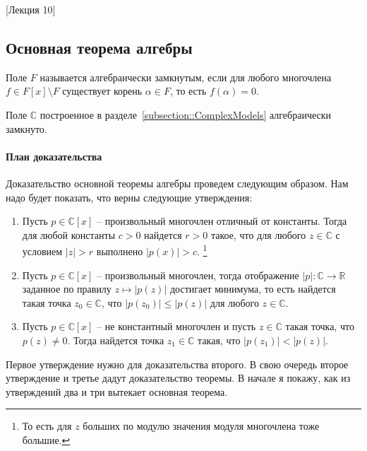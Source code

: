 [Лекция 10]


\subsection{Основная теорема алгебры}

\begin{definition}
Поле $F$ называется алгебраически замкнутым, если для любого многочлена $f\in F[x]\setminus F$ существует корень $\alpha\in F$, то есть $f(\alpha) = 0$.
\end{definition}


\begin{claim}
Поле $\mathbb C$ построенное в разделе~\ref{subsection::ComplexModels} алгебраически замкнуто.
\end{claim}

\paragraph{План доказательства}

Доказательство основной теоремы алгебры проведем следующим образом.
Нам надо будет показать, что верны следующие  утверждения:
\begin{enumerate}
\item Пусть $p\in \mathbb C[x]$ -- произвольный многочлен отличный от константы.
Тогда для любой константы $c > 0$ найдется $r > 0$ такое, что для любого $z\in\mathbb C$ с условием $|z| > r$ выполнено $|p(x)| > c$.%
\footnote{То есть для $z$ больших по модулю значения модуля многочлена тоже большие.}

\item Пусть $p\in \mathbb C[x]$ -- произвольный многочлен, тогда отображение $|p|\colon \mathbb C\to \mathbb R$ заданное по правилу $z\mapsto |p(z)|$ достигает минимума, то есть найдется такая точка $z_0\in\mathbb C$, что $|p(z_0)|\leqslant |p(z)|$ для любого $z\in \mathbb C$.

\item Пусть $p\in \mathbb C[x]$ -- не константный многочлен и пусть $z\in \mathbb C$ такая точка, что $p(z) \neq 0$.
Тогда найдется точка $z_1\in \mathbb C$ такая, что $|p(z_1)| < |p(z)|$.
\end{enumerate}

Первое утверждение нужно для доказательства второго.
В свою очередь второе утверждение и третье дадут доказательство теоремы.
В начале я покажу, как из утверждений два и три вытекает основная теорема.

